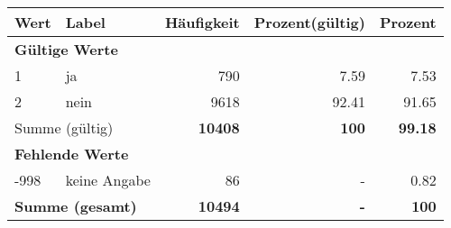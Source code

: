      \begin{longtable}{lXrrr}
     \toprule
     \textbf{Wert} & \textbf{Label} & \textbf{Häufigkeit} & \textbf{Prozent(gültig)} & \textbf{Prozent} \\
     \endhead
     \midrule
     \multicolumn{5}{l}{\textbf{Gültige Werte}}\\

     1 &
     \multicolumn{1}{X}{ ja   } &


       \num{790} &
       \num[round-mode=places,round-precision=2]{7.59} &
         \num[round-mode=places,round-precision=2]{7.53} \\

     2 &
     \multicolumn{1}{X}{ nein   } &


       \num{9618} &
       \num[round-mode=places,round-precision=2]{92.41} &
         \num[round-mode=places,round-precision=2]{91.65} \\
     \midrule
     \multicolumn{2}{l}{Summe (gültig)} &
       \textbf{\num{10408}} &
     \textbf{\num{100}} &
       \textbf{\num[round-mode=places,round-precision=2]{99.18}} \\
     \multicolumn{5}{l}{\textbf{Fehlende Werte}}\\
       -998 &
       keine Angabe &
         \num{86} &
        - &
         \num[round-mode=places,round-precision=2]{0.82} \\
     \midrule
     \multicolumn{2}{l}{\textbf{Summe (gesamt)}} &
          \textbf{\num{10494}} &
        \textbf{-} &
        \textbf{\num{100}} \\
     \bottomrule
     \end{longtable}
     
